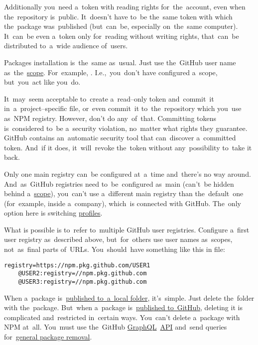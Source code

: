 Additionally you~need a~token with reading rights for~the~account, even when the~repository is~public.
It~doesn't have to~be the~same token with which the~package was~published (but~can~be, especially on~the~same computer).
It~can~be even a~token only for~reading without writing rights, that~can~be distributed to~a~wide audience of~users.

Packages installation is~the~same as~usual.
Just use the~GitHub user name as~the~\hyperref[nsmscopedpackages]{scope}.
For~example, .
I.e.,~you~don't have configured a~scope, but~you~act like you~do.

\warning It~may~seem acceptable to~create a~read--only token and~commit~it in~a~project--specific  file, or~even commit~it to~the~repository which you~use as~NPM registry.
However, don't do any~of~that.
Committing tokens is~considered to~be a~security violation, no~matter what rights they guarantee.
GitHub contains an~automatic security tool that can~discover a~committed token.
And~if it does, it~will~revoke the~token without any~possibility to~take it back.

\label{multipleregistries}
Only one main registry can~be configured at~a~time and~there's no way around.
And~as~GitHub registries need to~be~configured as~main (can't~be hidden behind a~\hyperref[npmscope]{scope}), you~can't use a~different main registry than the~default~one (for~example, inside a~company), which~is connected with GitHub.
The~only option here is switching \hyperref[npmprofile]{profiles}.

What is possible is to~refer to~multiple GitHub user registries.
Configure a~first user registry as~described above, but~for~others use user names as~scopes, not~as~final parts of~URLs.
You~should~have something like this in  file:
\begin{lstlisting}[frame=no]
    registry=https://npm.pkg.github.com/USER1
    @USER2:registry=//npm.pkg.github.com
    @USER3:registry=//npm.pkg.github.com
\end{lstlisting}

When a~package is~\hyperref[npmpublishlocal]{published to~a~local folder}, it's~simple.
Just delete the~folder with the~package.
But~when a~package is~\hyperref[npmpublishgithub]{published to~GitHub}, deleting it is complicated and~restricted in~certain ways.
You~can't delete a~package with NPM at~all.
You~must use the~GitHub \hyperref[graphql]{GraphQL}~\hyperref[api]{API} and~send queries for~\hyperref[githubdeletepackage]{general package removal}.

